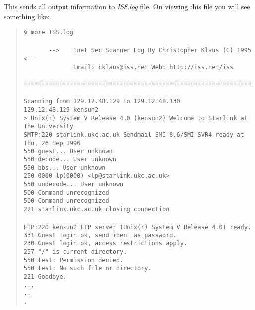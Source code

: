 This sends all output information to {\it ISS.log} file. On viewing
this file you will see something like:

\begin{quote}
\begin{scriptsize}
\verb+% more ISS.log+\\
\verb++\\
\verb+       -->    Inet Sec Scanner Log By Christopher Klaus (C) 1995    <--+\\
\verb+              Email: cklaus@iss.net Web: http://iss.net/iss+\\
\verb+       ================================================================+\\
\verb++\\
\verb+Scanning from 129.12.48.129 to 129.12.48.130+\\
\verb+129.12.48.129 kensun2+\\
\verb+> Unix(r) System V Release 4.0 (kensun2) Welcome to Starlink at The University+\\
\verb+SMTP:220 starlink.ukc.ac.uk Sendmail SMI-8.6/SMI-SVR4 ready at Thu, 26 Sep 1996+\\
\verb+550 guest... User unknown+\\
\verb+550 decode... User unknown+\\
\verb+550 bbs... User unknown+\\
\verb+250 0000-lp(0000) <lp@starlink.ukc.ac.uk>+\\
\verb+550 uudecode... User unknown+\\
\verb+500 Command unrecognized+\\
\verb+500 Command unrecognized+\\
\verb+221 starlink.ukc.ac.uk closing connection+\\
\verb++\\
\verb+FTP:220 kensun2 FTP server (Unix(r) System V Release 4.0) ready.+\\
\verb+331 Guest login ok, send ident as password.+\\
\verb+230 Guest login ok, access restrictions apply.+\\
\verb+257 "/" is current directory.+\\
\verb+550 test: Permission denied.+\\
\verb+550 test: No such file or directory.+\\
\verb+221 Goodbye.+\\
\verb+...+\\
\verb+..+\\
\verb+.+
\end{scriptsize}
\end{quote}

